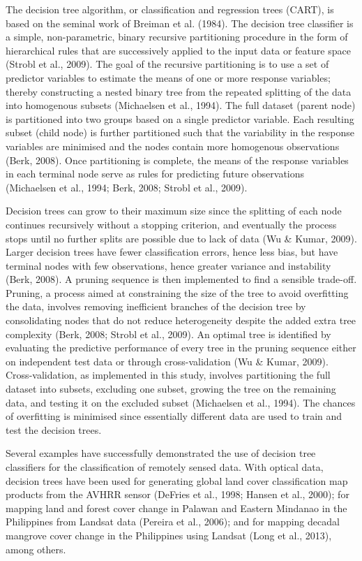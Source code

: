 The decision tree algorithm, or classification and regression trees (CART), is based on the seminal work of Breiman et al. (1984). The decision tree classifier is a simple, non-parametric, binary recursive partitioning procedure in the form of hierarchical rules that are successively applied to the input data or feature space (Strobl et al., 2009). The goal of the recursive partitioning is to use a set of predictor variables to estimate the means of one or more response variables; thereby constructing a nested binary tree from the repeated splitting of the data into homogenous subsets (Michaelsen et al., 1994). The full dataset (parent node) is partitioned into two groups based on a single predictor variable. Each resulting subset (child node) is further partitioned such that the variability in the response variables are minimised and the nodes contain more homogenous observations (Berk, 2008). Once partitioning is complete, the means of the response variables in each terminal node serve as rules for predicting future observations (Michaelsen et al., 1994; Berk, 2008; Strobl et al., 2009).

Decision trees can grow to their maximum size since the splitting of each node continues recursively without a stopping criterion, and eventually the process stops until no further splits are possible due to lack of data (Wu \& Kumar, 2009). Larger decision trees have fewer classification errors, hence less bias, but have terminal nodes with few observations, hence greater variance and instability (Berk, 2008). A pruning sequence is then implemented to find a sensible trade-off. Pruning, a process aimed at constraining the size of the tree to avoid overfitting the data, involves removing inefficient branches of the decision tree by consolidating nodes that do not reduce heterogeneity despite the added extra tree complexity (Berk, 2008; Strobl et al., 2009). An optimal tree is identified by evaluating the predictive performance of every tree in the pruning sequence either on independent test data or through cross-validation (Wu \& Kumar, 2009). Cross-validation, as implemented in this study, involves partitioning the full dataset into subsets, excluding one subset, growing the tree on the remaining data, and testing it on the excluded subset (Michaelsen et al., 1994). The chances of overfitting is minimised since essentially different data are used to train and test the decision trees.

Several examples have successfully demonstrated the use of decision tree classifiers for the classification of remotely sensed data. With optical data, decision trees have been used for generating global land cover classification map products from the AVHRR sensor (DeFries et al., 1998; Hansen et al., 2000); for mapping land and forest cover change in Palawan and Eastern Mindanao in the Philippines from Landsat data (Pereira et al., 2006); and for mapping decadal mangrove cover change in the Philippines using Landsat (Long et al., 2013), among others.

